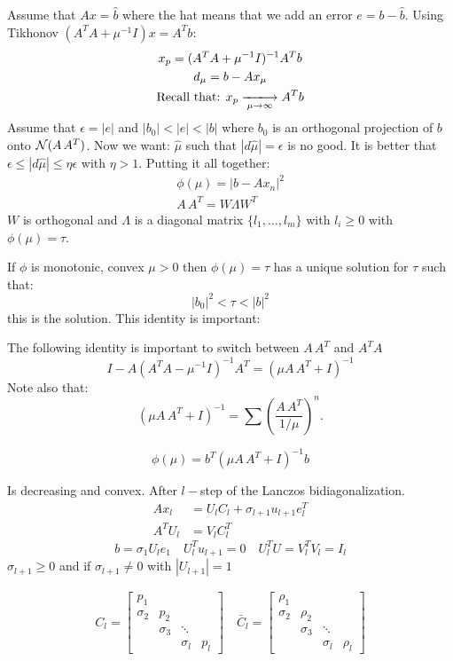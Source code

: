 Assume that $Ax= \hat b$ where the hat means that we add an error $e= b-\hat b$.
Using Tikhonov $(A^TA + \mu^{-1} I) x = A^T b$:
\begin{gather*}
x_p = (A^TA + \mu^{-1} I )^{-1} A^T b \\
d_\mu = b- Ax_\mu \\
\text{Recall that: } x_p \xlongrightarrow[\mu \to \infty]{} A^T b
\end{gather*}
Assume that $\epsilon = |e| $ and $|b_0| < |e| < |b|$ where $b_0$ is an orthogonal projection of $b$ onto $\mathcal{N}(A\, A^T)$. Now we want: $\hat \mu$ such that $|d\hat \mu | = \epsilon$ is no good. It is better that $\epsilon \leq |d\hat \mu| \leq \eta \epsilon$ with $\eta>1$. Putting it all together:
\begin{gather*}
\phi(\mu) = | b- A x_n |^2 \\
A\, A^T = W \Lambda W^T 
\end{gather*} 
 $W$ is orthogonal and $ \Lambda$  is a diagonal matrix $ \{l_1,\ldots, l_m \}$  with $ l_i \geq 0$ with  $\phi(\mu) = \tau$.

\begin{teorema}
If $\phi$ is monotonic, convex $\mu>0$ then $\phi(\mu) = \tau$ has a unique solution for $\tau$ such that:
$$ |b_0|^2 < \tau < |b|^2$$
this is the solution. This identity is important:
\end{teorema}
The following identity is important to switch between $A\, A^T$ and $A^T A$
$$ I - A(A^TA - \mu^{-1} I )^{-1} A^T = (\mu A\, A^T + I )^{-1}$$
Note also that:
$$ (\mu A\, A^T + I )^{-1} = \sum \left( \frac{A\, A^T}{1/\mu} \right)^n.$$

\begin{teorema}
$$\phi(\mu) = b^T (\mu A\, A^T + I)^{-1} b$$
\end{teorema}
Is decreasing  and convex. After $l-$step of the Lanczos bidiagonalization.
\begin{align*}
Ax_l &=  U_lC_l + \sigma_{l+1} u_{l+1} e_l^T\\
A^T U_l &= V_l C_l^T
\end{align*}
$$b= \sigma_1 U_l e_1 \quad U_l^T u_{l+1} = 0 \quad U_l^T U = V_l^T V_l = I_l$$
$\sigma_{l+1} \geq 0$ and if $\sigma_{l+1}\neq 0 $ with $|U_{l+1}|=1$

\begin{gather*}
C_l = \begin{bmatrix}
p_1 & & & \\
\sigma_2 & p_2 & & \\
         & \sigma_3 & \ddots  & \\
         &        & \sigma_l & p_l
\end{bmatrix} \quad 
\bar C_l = \begin{bmatrix}
\rho_1 & & & \\
\sigma_2 & \rho_2 & & \\
         & \sigma_3 & \ddots & \\
         &          & \sigma_l & \rho_l 
\end{bmatrix}
\end{gather*}

